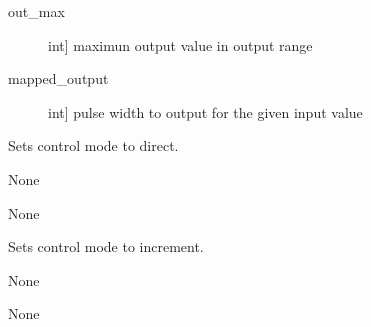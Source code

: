 \documentclass[letterpaper,10pt,english]{sphinxmanual}
\begin{document}
\begin{fulllineitems}
\begin{fulllineitems}
\begin{description}
\item[{out\_max}] \leavevmode{[}int{]}
\sphinxAtStartPar
maximun output value in output range

\end{description}

\sphinxAtStartPar
{}
\begin{description}
\item[{mapped\_output}] \leavevmode{[}int{]}
\sphinxAtStartPar
pulse width to output for the given input value

\end{description}

\end{fulllineitems}


\begin{fulllineitems}
\label{\detokenize{specific:EyebrowsOutput.EyebrowsOutput.set_control_direct}}
\sphinxAtStartPar
Sets control mode to direct.

\sphinxAtStartPar
{}

\sphinxAtStartPar
None

\sphinxAtStartPar
{}

\sphinxAtStartPar
None

\end{fulllineitems}


\begin{fulllineitems}
\label{\detokenize{specific:EyebrowsOutput.EyebrowsOutput.set_control_increment}}
\sphinxAtStartPar
Sets control mode to increment.

\sphinxAtStartPar
{}

\sphinxAtStartPar
None

\sphinxAtStartPar
{}

\sphinxAtStartPar
None

\end{fulllineitems}


\end{fulllineitems}
\end{document}

